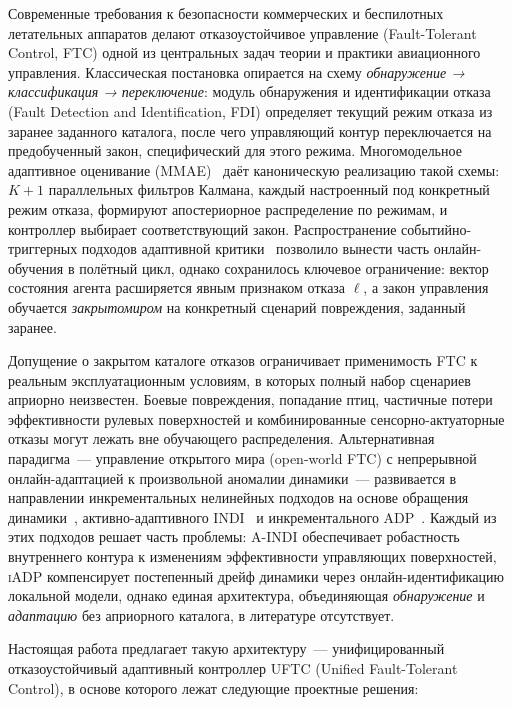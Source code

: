 \documentclass[a4paper,14pt]{extarticle}
\newcommand{\UFTC}{\textsc{UFTC}}
\newcommand{\IADP}{\textsc{iADP}}
\newcommand{\AINDI}{\textsc{A-INDI}}
\begin{document}
Современные требования к безопасности коммерческих и беспилотных летательных аппаратов делают отказоустойчивое управление (Fault-Tolerant Control, FTC) одной из центральных задач теории и практики авиационного управления. Классическая постановка опирается на схему \emph{обнаружение → классификация → переключение}: модуль обнаружения и идентификации отказа (Fault Detection and Identification, FDI) определяет текущий режим отказа из заранее заданного каталога, после чего управляющий контур переключается на предобученный закон, специфический для этого режима. Многомодельное адаптивное оценивание (MMAE)~\cite{lu2015,lu2017} даёт каноническую реализацию такой схемы: $K+1$ параллельных фильтров Калмана, каждый настроенный под конкретный режим отказа, формируют апостериорное распределение по режимам, и контроллер выбирает соответствующий закон. Распространение событийно-триггерных подходов адаптивной критики~\cite{sun2022stab,konatala2024} позволило вынести часть онлайн-обучения в полётный цикл, однако сохранилось ключевое ограничение: вектор состояния агента расширяется явным признаком отказа $\ell$, а закон управления обучается \emph{закрытомиром} на конкретный сценарий повреждения, заданный заранее.

Допущение о закрытом каталоге отказов ограничивает применимость FTC к реальным эксплуатационным условиям, в которых полный набор сценариев априорно неизвестен. Боевые повреждения, попадание птиц, частичные потери эффективности рулевых поверхностей и комбинированные сенсорно-актуаторные отказы могут лежать вне обучающего распределения. Альтернативная парадигма~--- управление открытого мира (open-world FTC) с непрерывной онлайн-адаптацией к произвольной аномалии динамики~--- развивается в направлении инкрементальных нелинейных подходов на основе обращения динамики~\cite{sieberling2010,wang2019}, активно-адаптивного INDI~\cite{aaindi2024} и инкрементального ADP~\cite{zhou2018,konatala2024}. Каждый из этих подходов решает часть проблемы: \AINDI{} обеспечивает робастность внутреннего контура к изменениям эффективности управляющих поверхностей, \IADP{} компенсирует постепенный дрейф динамики через онлайн-идентификацию локальной модели, однако единая архитектура, объединяющая \emph{обнаружение} и \emph{адаптацию} без априорного каталога, в литературе отсутствует.

Настоящая работа предлагает такую архитектуру~--- унифицированный отказоустойчивый адаптивный контроллер \UFTC{} (Unified Fault-Tolerant Control), в основе которого лежат следующие проектные решения:
\end{document}
